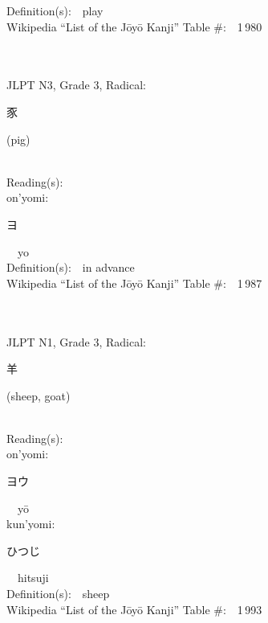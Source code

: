 \begin{multicols}{2}
Definition(s):\ \ play \\
Wikipedia ``List of the J\=oy\=o Kanji'' Table \#:\ \ 1\,980 \\
\ \ \\
{\fontsize{34pt}{40pt}  }\ \ \\  %
{JLPT N3, Grade 3, Radical:\ \ {\begin{CJK}{UTF8}{min} 豕 \end{CJK}} (pig) } \\
Reading(s):\ \ \\
{\hspace*{1em}}on'yomi:\ \ \\
{\hspace*{2em}}{\begin{CJK}{UTF8}{min} ヨ \end{CJK}}\ \ yo\ \ \\
Definition(s):\ \ in advance \\
Wikipedia ``List of the J\=oy\=o Kanji'' Table \#:\ \ 1\,987 \\
\ \ \\
{\fontsize{34pt}{40pt}  }\ \ \\  %
{JLPT N1, Grade 3, Radical:\ \ {\begin{CJK}{UTF8}{min} 羊 \end{CJK}} (sheep, goat) } \\
Reading(s):\ \ \\
{\hspace*{1em}}on'yomi:\ \ \\
{\hspace*{2em}}{\begin{CJK}{UTF8}{min} ヨウ \end{CJK}}\ \ y\=o\ \ \\
{\hspace*{1em}}kun'yomi:\ \ \\
{\hspace*{2em}}{\begin{CJK}{UTF8}{min} ひつじ \end{CJK}}\ \ hitsuji\ \ \\
Definition(s):\ \ sheep \\
Wikipedia ``List of the J\=oy\=o Kanji'' Table \#:\ \ 1\,993 \\

\end{multicols}
